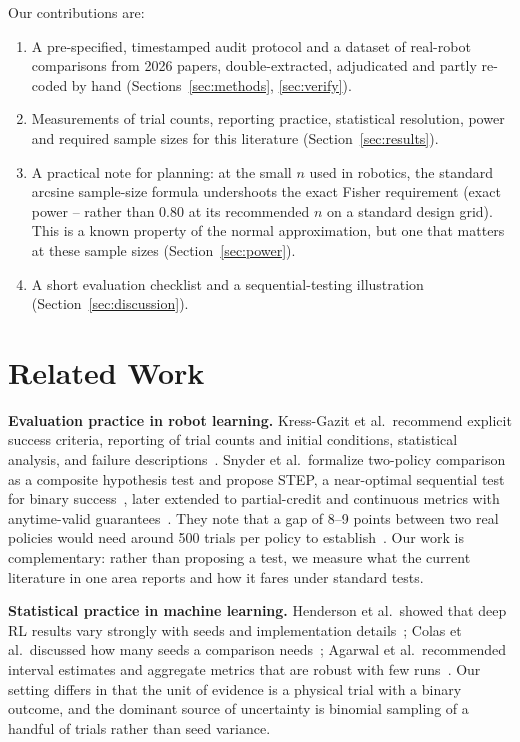 \documentclass[11pt]{article}
\begin{document}
Our contributions are:
\begin{enumerate}[leftmargin=*,itemsep=2pt]
\item A pre-specified, timestamped audit protocol and a dataset of \AuditBinaryRows{} real-robot comparisons from \AuditIncluded{} 2026 papers, double-extracted, adjudicated and partly re-coded by hand (Sections~\ref{sec:methods}, \ref{sec:verify}).
\item Measurements of trial counts, reporting practice, statistical resolution, power and required sample sizes for this literature (Section~\ref{sec:results}).
\item A practical note for planning: at the small $n$ used in robotics, the standard arcsine sample-size formula undershoots the exact Fisher requirement (exact power \AuditDesignPowMin--\AuditDesignPowMax{} rather than 0.80 at its recommended $n$ on a standard design grid). This is a known property of the normal approximation, but one that matters at these sample sizes (Section~\ref{sec:power}).
\item A short evaluation checklist and a sequential-testing illustration (Section~\ref{sec:discussion}).
\end{enumerate}

\section{Related Work}
\textbf{Evaluation practice in robot learning.} Kress-Gazit et al.\ recommend explicit success criteria, reporting of trial counts and initial conditions, statistical analysis, and failure descriptions~\cite{kressgazit2024}. Snyder et al.\ formalize two-policy comparison as a composite hypothesis test and propose STEP, a near-optimal sequential test for binary success~\cite{snyder2025step}, later extended to partial-credit and continuous metrics with anytime-valid guarantees~\cite{snyder2026nscore}. They note that a gap of 8--9 points between two real policies would need around 500 trials per policy to establish~\cite{snyder2025step}. Our work is complementary: rather than proposing a test, we measure what the current literature in one area reports and how it fares under standard tests.

\textbf{Statistical practice in machine learning.} Henderson et al.\ showed that deep RL results vary strongly with seeds and implementation details~\cite{henderson2018}; Colas et al.\ discussed how many seeds a comparison needs~\cite{colas2018}; Agarwal et al.\ recommended interval estimates and aggregate metrics that are robust with few runs~\cite{agarwal2021}. Our setting differs in that the unit of evidence is a physical trial with a binary outcome, and the dominant source of uncertainty is binomial sampling of a handful of trials rather than seed variance.
\end{document}
